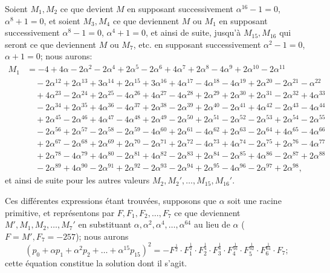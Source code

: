 \documentclass[12pt,a4paper]{article}
\theoremstyle{definition}
\begin{document}
Soient $M_1, M_2$ ce que devient $M$ en supposant successivement $\alpha^{16} - 1 = 0$, $\alpha^8 + 1 = 0$, et soient $M_3, M_4$ ce que deviennent $M$ ou $M_1$ en supposant successivement $\alpha^8 - 1 = 0$, $\alpha^4 + 1 = 0$, et ainsi de suite, jusqu'\`{a} $M_{15}, M_{16}$ qui seront ce que deviennent $M$ ou $M_7$, etc. en supposant successivement $\alpha^2 - 1 = 0$, $\alpha + 1 = 0$; nous aurons:
\begin{align*}
M_1 &= -4 + 4\alpha - 2\alpha^2 - 2\alpha^4 + 2\alpha^5 - 2\alpha^6 + 4\alpha^7 + 2\alpha^8 - 4\alpha^9 + 2\alpha^{10} - 2\alpha^{11} \\
&\quad - 2\alpha^{12} + 2\alpha^{13} + 3\alpha^{14} + 2\alpha^{15} + 3\alpha^{16} + 4\alpha^{17} - 4\alpha^{18} - 4\alpha^{19} + 2\alpha^{20} - 2\alpha^{21} - \alpha^{22} \\
&\quad + 4\alpha^{23} - 2\alpha^{24} + 2\alpha^{25} - 4\alpha^{26} + 4\alpha^{27} - 4\alpha^{28} + 2\alpha^{29} + 2\alpha^{30} + 2\alpha^{31} - 2\alpha^{32} + 4\alpha^{33} \\
&\quad - 2\alpha^{34} + 2\alpha^{35} + 4\alpha^{36} - 4\alpha^{37} + 2\alpha^{38} - 2\alpha^{39} + 2\alpha^{40} - 2\alpha^{41} + 4\alpha^{42} - 2\alpha^{43} - 4\alpha^{44} \\
&\quad + 2\alpha^{45} - 2\alpha^{46} + 4\alpha^{47} - 4\alpha^{48} + 2\alpha^{49} - 2\alpha^{50} + 2\alpha^{51} - 2\alpha^{52} - 2\alpha^{53} + 2\alpha^{54} - 2\alpha^{55} \\
&\quad - 2\alpha^{56} + 2\alpha^{57} - 2\alpha^{58} - 2\alpha^{59} - 4\alpha^{60} + 2\alpha^{61} - 4\alpha^{62} + 2\alpha^{63} - 2\alpha^{64} + 4\alpha^{65} - 4\alpha^{66} \\
&\quad + 2\alpha^{67} - 2\alpha^{68} + 2\alpha^{69} + 2\alpha^{70} - 2\alpha^{71} + 2\alpha^{72} - 4\alpha^{73} + 4\alpha^{74} - 2\alpha^{75} + 2\alpha^{76} - 4\alpha^{77} \\
&\quad + 2\alpha^{78} - 4\alpha^{79} + 4\alpha^{80} - 2\alpha^{81} + 4\alpha^{82} - 2\alpha^{83} + 2\alpha^{84} - 2\alpha^{85} + 4\alpha^{86} - 2\alpha^{87} + 2\alpha^{88} \\
&\quad - 2\alpha^{89} + 4\alpha^{90} - 2\alpha^{91} + 2\alpha^{92} - 2\alpha^{93} - 2\alpha^{94} + 2\alpha^{95} - 4\alpha^{96} - 2\alpha^{97} + 2\alpha^{98},
\end{align*}
et ainsi de suite pour les autres valeurs $M_2, M_2', \ldots, M_{15}, M_{16}'$.

Ces diff\'{e}rentes expressions \'{e}tant trouv\'{e}es, supposons que $\alpha$ soit une racine primitive, et repr\'{e}sentons par $F, F_1, F_2, \ldots, F_7$ ce que deviennent $M', M_1, M_2, \ldots, M_7'$ en substituant $\alpha, \alpha^2, \alpha^4, \ldots, \alpha^{64}$ au lieu de $\alpha$ ($F = M', F_7 = -257$); nous aurons
\[
(p_0 + \alpha p_1 + \alpha^2 p_2 + \ldots + \alpha^{15} p_{15})^2 = -F^{\frac{1}{2}} \cdot F_1^{\frac{1}{2}} \cdot F_2^{\frac{1}{4}} \cdot F_3^{\frac{1}{8}} \cdot F_4^{\frac{1}{16}} \cdot F_5^{\frac{1}{32}} \cdot F_6^{\frac{1}{64}} \cdot F_7;
\]
cette \'{e}quation constitue la solution dont il s'agit.
\end{document}
